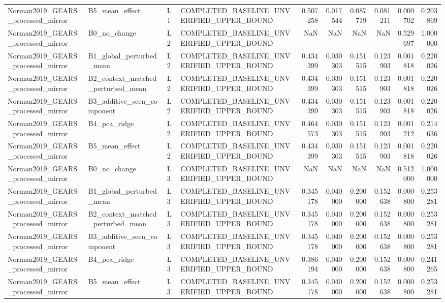 \begin{tabular}{llllrrrrrr}
Norman2019_GEARS_processed_mirror & B5_mean_effect & L1 & COMPLETED_BASELINE_UNVERIFIED_UPPER_BOUND & 0.507258 & 0.017544 & 0.087719 & 0.081211 & 0.000702 & 0.203869 \\
Norman2019_GEARS_processed_mirror & B0_no_change & L2 & COMPLETED_BASELINE_UNVERIFIED_UPPER_BOUND & NaN & NaN & NaN & NaN & 0.529697 & 1.000000 \\
Norman2019_GEARS_processed_mirror & B1_global_perturbed_mean & L2 & COMPLETED_BASELINE_UNVERIFIED_UPPER_BOUND & 0.434399 & 0.030303 & 0.151515 & 0.123903 & 0.001818 & 0.220026 \\
Norman2019_GEARS_processed_mirror & B2_context_matched_perturbed_mean & L2 & COMPLETED_BASELINE_UNVERIFIED_UPPER_BOUND & 0.434399 & 0.030303 & 0.151515 & 0.123903 & 0.001818 & 0.220026 \\
Norman2019_GEARS_processed_mirror & B3_additive_seen_component & L2 & COMPLETED_BASELINE_UNVERIFIED_UPPER_BOUND & 0.434399 & 0.030303 & 0.151515 & 0.123903 & 0.001818 & 0.220026 \\
Norman2019_GEARS_processed_mirror & B4_pca_ridge & L2 & COMPLETED_BASELINE_UNVERIFIED_UPPER_BOUND & 0.464573 & 0.030303 & 0.151515 & 0.123903 & 0.001212 & 0.214636 \\
Norman2019_GEARS_processed_mirror & B5_mean_effect & L2 & COMPLETED_BASELINE_UNVERIFIED_UPPER_BOUND & 0.434399 & 0.030303 & 0.151515 & 0.123903 & 0.001818 & 0.220026 \\
Norman2019_GEARS_processed_mirror & B0_no_change & L3 & COMPLETED_BASELINE_UNVERIFIED_UPPER_BOUND & NaN & NaN & NaN & NaN & 0.512000 & 1.000000 \\
Norman2019_GEARS_processed_mirror & B1_global_perturbed_mean & L3 & COMPLETED_BASELINE_UNVERIFIED_UPPER_BOUND & 0.345178 & 0.040000 & 0.200000 & 0.152638 & 0.000800 & 0.253281 \\
Norman2019_GEARS_processed_mirror & B2_context_matched_perturbed_mean & L3 & COMPLETED_BASELINE_UNVERIFIED_UPPER_BOUND & 0.345178 & 0.040000 & 0.200000 & 0.152638 & 0.000800 & 0.253281 \\
Norman2019_GEARS_processed_mirror & B3_additive_seen_component & L3 & COMPLETED_BASELINE_UNVERIFIED_UPPER_BOUND & 0.345178 & 0.040000 & 0.200000 & 0.152638 & 0.000800 & 0.253281 \\
Norman2019_GEARS_processed_mirror & B4_pca_ridge & L3 & COMPLETED_BASELINE_UNVERIFIED_UPPER_BOUND & 0.386194 & 0.040000 & 0.200000 & 0.152638 & 0.000800 & 0.241265 \\
Norman2019_GEARS_processed_mirror & B5_mean_effect & L3 & COMPLETED_BASELINE_UNVERIFIED_UPPER_BOUND & 0.345178 & 0.040000 & 0.200000 & 0.152638 & 0.000800 & 0.253281 \\

\end{tabular}
